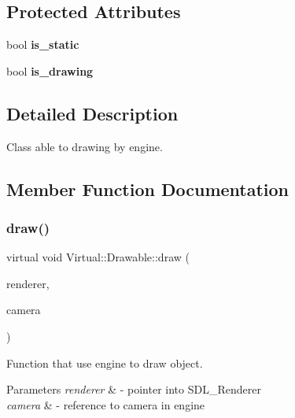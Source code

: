 \subsection*{Protected Attributes}
\begin{DoxyCompactItemize}
\item 
\hypertarget{class_virtual_1_1_drawable_a75aa2adddb490011c1efaea42ab16079}{}\label{class_virtual_1_1_drawable_a75aa2adddb490011c1efaea42ab16079} 
bool {\bfseries is\+\_\+static}
\item 
\hypertarget{class_virtual_1_1_drawable_a360d6ddca18c7f4f6699662ba4102c2a}{}\label{class_virtual_1_1_drawable_a360d6ddca18c7f4f6699662ba4102c2a} 
bool {\bfseries is\+\_\+drawing}
\end{DoxyCompactItemize}


\subsection{Detailed Description}
Class able to drawing by engine. 

\subsection{Member Function Documentation}
\hypertarget{class_virtual_1_1_drawable_af7014800911efa59b96e538149e56f8b}{}\label{class_virtual_1_1_drawable_af7014800911efa59b96e538149e56f8b} 
\subsubsection{\texorpdfstring{draw()}{draw()}}
{\footnotesize\ttfamily virtual void Virtual\+::\+Drawable\+::draw (\begin{DoxyParamCaption}\item[{S\+D\+L\+\_\+\+Renderer $\ast$}]{renderer,  }\item[{\hyperlink{class_virtual_1_1_camera}{Camera} \&}]{camera }\end{DoxyParamCaption})\hspace{0.3cm}{\ttfamily [pure virtual]}}



Function that use engine to draw object. 


\begin{DoxyParams}{Parameters}
{\em renderer} & -\/ pointer into S\+D\+L\+\_\+\+Renderer \\
\hline
{\em camera} & -\/ reference to camera in engine \\
\hline
\end{DoxyParams}


